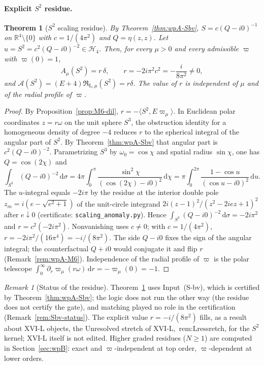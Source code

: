 \documentclass{article}
\newtheorem{theorem}[proposition]{Theorem}
\theoremstyle{remark}
\newtheorem{remark}[proposition]{Remark}
\begin{document}
\paragraph{Explicit $S^2$ residue.}
\begin{theorem}[$S^2$ scaling residue]
\label{thm:M6-S2}
By Theorem~\ref{thm:wpA-Sbv}, $S=c(Q-i0)^{-1}$ on $\mathbb R^4\setminus\{0\}$ with $c=1/(4\pi^2)$ and $Q=\eta(z,z)$.
Let $u=S^2=c^2(Q-i0)^{-2}\in\mathcal H_4$.
Then, for every $\mu>0$ and every admissible $\varpi$ with $\varpi(0)=1$,
\[
A_\mu(S^2)=r\,\delta,
\qquad
r=-2i\pi^2 c^2=-\frac{i}{8\pi^2}\neq0,
\]
and $\mathcal A(S^2)=(E+4)\mathfrak R_{\mathrm L,\mu}(S^2)=r\delta$.
The value of $r$ is independent of $\mu$ and of the radial profile of $\varpi$.
\end{theorem}

\begin{proof}
By Proposition~\ref{prop:M6-dil}, $r=-\langle S^2,E\varpi_\mu\rangle$.
In Euclidean polar coordinates $z=r\omega$ on the unit sphere $S^3$, the obstruction identity for a homogeneous density of degree $-4$ reduces $r$ to the spherical integral of the angular part of $S^2$.
By Theorem~\ref{thm:wpA-Sbv} that angular part is $c^2(Q-i0)^{-2}$.
Parametrizing $S^3$ by $\omega_0=\cos\chi$ and spatial radius $\sin\chi$, one has $Q=\cos(2\chi)$ and
\[
\int_{S^3}(Q-i0)^{-2}\,\mathrm d\sigma
=
4\pi\int_0^\pi\frac{\sin^2\chi}{(\cos(2\chi)-i0)^2}\,\mathrm d\chi
=
\pi\int_0^{2\pi}\frac{1-\cos u}{(\cos u-i0)^2}\,\mathrm d u.
\]
The $u$-integral equals $-2i\pi$ by the residue at the interior double pole $z_m=i(e-\sqrt{e^2+1})$ of the unit-circle integrand $2i(z-1)^2/(z^2-2iez+1)^2$ after $e\downarrow0$ (certificate: \texttt{scaling\_anomaly.py}).
Hence $\int_{S^3}(Q-i0)^{-2}\,\mathrm d\sigma=-2i\pi^2$ and $r=c^2(-2i\pi^2)$.
Nonvanishing uses $c\neq0$; with $c=1/(4\pi^2)$, $r=-2i\pi^2/(16\pi^4)=-i/(8\pi^2)$.
The side $Q-i0$ fixes the sign of the angular integral; the counterfactual $Q+i0$ would conjugate it and flip $r$ (Remark~\ref{rem:wpA-M6}).
Independence of the radial profile of $\varpi$ is the polar telescope $\int_0^\infty\partial_r\varpi_\mu(r\omega)\,\mathrm d r=-\varpi_\mu(0)=-1$.
\end{proof}

\begin{remark}[Status of the residue]
\label{rem:M6-Sbv}
Theorem~\ref{thm:M6-S2} uses Input~(S-bv), which is certified by Theorem~\ref{thm:wpA-Sbv}; the logic does not run the other way (the residue does not certify the gate), and matching played no role in the certification (Remark~\ref{rem:Sbv-status}).
The explicit value $r=-i/(8\pi^2)$ fills, as a result about XVI-L objects, the Unresolved stretch of XVI-L,~rem:Lressretch, for the $S^2$ kernel; XVI-L itself is not edited.
Higher graded residues ($N\ge1$) are computed in Section~\ref{sec:wpB}: exact and $\varpi$-independent at top order, $\varpi$-dependent at lower orders.
\end{remark}
\end{document}
